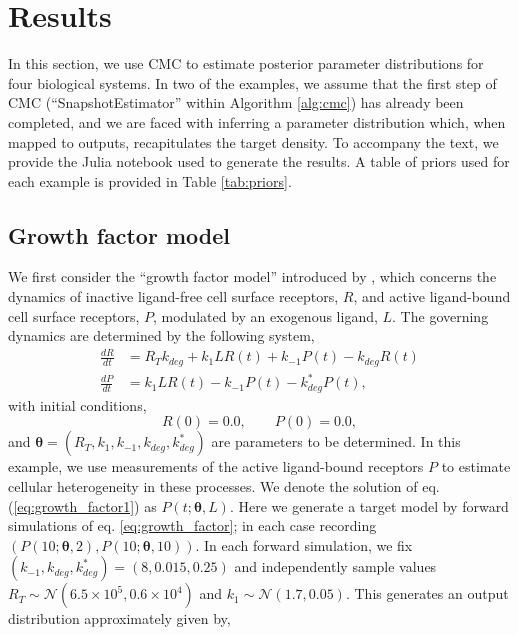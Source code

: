 \section{Results}\label{sec:results}
In this section, we use CMC to estimate posterior parameter distributions for four biological systems. In two of the examples, we assume that the first step of CMC (``SnapshotEstimator'' within Algorithm \ref{alg:cmc}) has already been completed, and we are faced with inferring a parameter distribution which, when mapped to outputs, recapitulates the target density. To accompany the text, we provide the Julia notebook used to generate the results. A table of priors used for each example is provided in Table \ref{tab:priors}.


\subsection{Growth factor model}
We first consider the ``growth factor model'' introduced by \cite{dixit2018maximum}, which concerns the dynamics of inactive ligand-free cell surface receptors, $R$, and active ligand-bound cell surface receptors, $P$, modulated by an exogenous ligand, $L$. The governing dynamics are determined by the following system,
%
\begin{align}\label{eq:growth_factor}
\frac{dR}{dt} &= R_T k_{deg} + k_1 L R(t) + k_{-1} P(t) - k_{deg} R(t)\\
\label{eq:growth_factor1}
\frac{dP}{dt} &= k_1 L R(t) - k_{-1} P(t) - k^*_{deg} P(t),
\end{align}
with initial conditions,
\begin{equation*}
R(0) = 0.0, \qquad P(0) = 0.0,
\end{equation*}
%
and $\boldsymbol{\theta}=(R_T, k_1, k_{-1}, k_{deg}, k^*_{deg})$ are parameters to be determined. In this example, we use measurements of the active ligand-bound receptors $P$ to estimate cellular heterogeneity in these processes. We denote the solution of eq. (\ref{eq:growth_factor1}) as $P(t; \boldsymbol{\theta}, L)$. Here we generate a target model by forward simulations of eq. \eqref{eq:growth_factor}; in each case recording $(P(10; \boldsymbol{\theta}, 2), P(10; \boldsymbol{\theta}, 10))$. In each forward simulation, we fix $(k_{-1}, k_{deg}, k^*_{deg}) = (8, 0.015, 0.25)$ and independently sample values ${R_T\sim \mathcal{N}(6.5\times 10^5, 0.6\times 10^4)}$ and ${k_1\sim \mathcal{N}(1.7, 0.05)}$. This generates an output distribution approximately given by,
%
